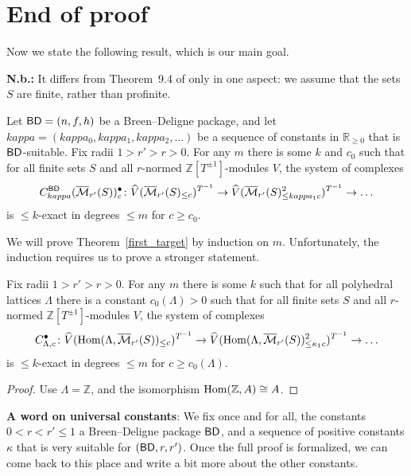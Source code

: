 \section{End of proof}

Now we state the following result, which is our main goal.

\textbf{N.b.:}
It differs from Theorem~9.4 of \cite{Analytic} only in one aspect:
we assume that the sets $S$ are finite, rather than profinite.

\begin{theorem}
  \label{first_target}
  \leanok
  Let $\mathsf{BD} = (n,f,h)$ be a Breen--Deligne package,
  and let $kappa = (kappa_0, kappa_1, kappa_2, \dots)$ be a sequence of constants in $\mathbb R_{\ge 0}$
  that is $\mathsf{BD}$-suitable.
	Fix radii $1>r'>r>0$.
  For any $m$ there is some $k$ and $c_0$ such that for all finite sets $S$ and all $r$-normed $\mathbb Z[T^{\pm 1}]$-modules $V$,
  the system of complexes
  \[
    C^{\mathsf{BD}}_{kappa}(\overline{\mathcal M}_{r'}(S))_c^\bullet \colon
    \widehat{V}(\overline{\mathcal M}_{r'}(S)_{\leq c})^{T^{-1}} \to
    \widehat{V}(\overline{\mathcal M}_{r'}(S)_{\leq kappa_1c}^2)^{T^{-1}}
    \to \ldots
  \]
  is $\leq k$-exact in degrees $\leq m$ for $c\geq c_0$.
\end{theorem}

We will prove Theorem~\ref{first_target} by induction on $m$.
Unfortunately, the induction requires us to prove a stronger statement.

\begin{theorem}
  \label{explicit}
  \leanok
  Fix radii $1>r'>r>0$. For any $m$ there is some $k$
  such that for all polyhedral lattices $\Lambda$
  there is a constant $c_0(\Lambda)>0$
  such that for all finite sets $S$
  and all $r$-normed $\mathbb Z[T^{\pm 1}]$-modules $V$,
  the system of complexes
  \[
  C_{\Lambda,c}^\bullet \colon
  \widehat{V}(\operatorname{Hom}(\Lambda,\overline{\mathcal M}_{r'}(S))_{\leq c})^{T^{-1}} \to
  \widehat{V}(\operatorname{Hom}(\Lambda,\overline{\mathcal M}_{r'}(S))_{\leq \kappa_1c}^2)^{T^{-1}} \to \ldots
  \]
  is $\leq k$-exact in degrees $\leq m$ for $c\geq c_0(\Lambda)$.
\end{theorem}

\begin{proof}
  \leanok
  Use $\Lambda = \mathbb Z$, and the isomorphism $\operatorname{Hom}(\mathbb Z, A) \cong A$.
\end{proof}

\textbf{A word on universal constants}:
We fix once and for all, the constants $0 < r < r' \le 1$
a Breen--Deligne package $\mathsf{BD}$,
and a sequence of positive constants $\kappa$ that is very suitable for $(\mathsf{BD}, r, r')$.
Once the full proof is formalized,
we can come back to this place and write a bit more about the other constants.

